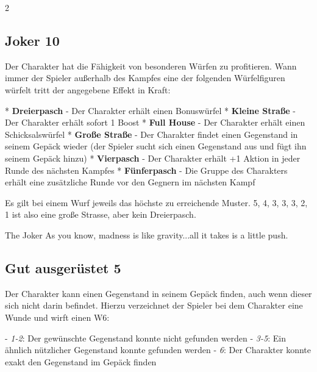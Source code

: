 \begin{multicols}{2}
\begin{tcolorbox}
\end{tcolorbox}

\begin{tcolorbox}
    \subsection*{Joker \hfill \small{10 }}
    \tcblower
Der Charakter hat die Fähigkeit von besonderen Würfen zu profitieren. Wann immer der Spieler außerhalb des Kampfes eine der folgenden Würfelfiguren würfelt tritt der angegebene Effekt in Kraft:

* \textbf{Dreierpasch} - Der Charakter erhält einen Bonuswürfel
* \textbf{Kleine Straße} - Der Charakter erhält sofort 1 Boost
* \textbf{Full House} - Der Charakter erhält einen Schicksalswürfel
* \textbf{Große Straße} - Der Charakter findet einen Gegenstand in seinem Gepäck wieder (der Spieler sucht sich einen Gegenstand aus und fügt ihn seinem Gepäck hinzu)
* \textbf{Vierpasch} - Der Charakter erhält +1 Aktion in jeder Runde des nächsten Kampfes
* \textbf{Fünferpasch} - Die Gruppe des Charakters erhält eine zusätzliche Runde vor den Gegnern im nächsten Kampf

Es gilt bei einem Wurf jeweils das höchste zu erreichende Muster. 5, 4, 3, 3, 3, 2, 1 ist also eine große Strasse, aber kein Dreierpasch.

\begin{pquote}{The Joker}
As you know, madness is like gravity...all it takes is a little push.
\end{pquote}

\vspace{3mm}



\end{tcolorbox}

\begin{tcolorbox}
    \subsection*{Gut ausgerüstet \hfill \small{5 }}
    \tcblower
Der Charakter kann einen Gegenstand in seinem Gepäck finden, auch wenn dieser sich nicht darin befindet. Hierzu verzeichnet der Spieler bei dem Charakter eine Wunde und wirft einen W6:

-  \textit{1-2}: Der gewünschte Gegenstand konnte nicht gefunden werden
-  \textit{3-5}: Ein ähnlich nützlicher Gegenstand konnte gefunden werden
- \textit{6}: Der Charakter konnte exakt den Gegenstand im Gepäck finden


\end{tcolorbox}
\end{multicols}
